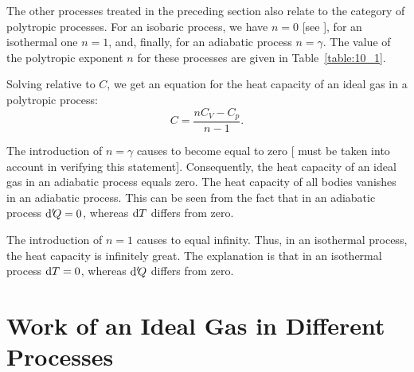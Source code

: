 The other processes treated in the preceding section also relate to the category of polytropic processes. For an isobaric process, we have $n=0$ [see ], for an isothermal one $n=1$, and, finally, for an adiabatic process $n=\gamma$. The value of the polytropic exponent $n$ for these processes are given in Table~\ref{table:10_1}.

\begin{table}[!b]
	\renewcommand{\arraystretch}{1.2}
	\caption{ }
	\vspace{-0.6cm}
	\label{table:10_1}
	\begin{center}\end{center}
\end{table}

Solving  relative to $C$, we get an equation for the heat capacity of an ideal gas in a polytropic process:
\begin{equation}\label{eq:10_52}
	C = \frac{n C_V - C_p}{n - 1}.
\end{equation}

\noindent
The introduction of $n=\gamma$ causes  to become equal to zero [ must be taken into account in verifying this statement]. Consequently, the heat capacity of an ideal gas in an adiabatic process equals zero. The heat capacity of all bodies vanishes in an adiabatic process. This can be seen from the fact that in an adiabatic process $\mathrm{d}'\!Q=0$, whereas $\mathrm{d} T$ differs from zero.

The introduction of $n=1$ causes  to equal infinity. Thus, in an isothermal process, the heat capacity is infinitely great. The explanation is that in an isothermal process $\mathrm{d} T=0$, whereas $\mathrm{d}'\!Q$ differs from zero.

\section{Work of an Ideal Gas in Different Processes}\label{sec:10_12}


